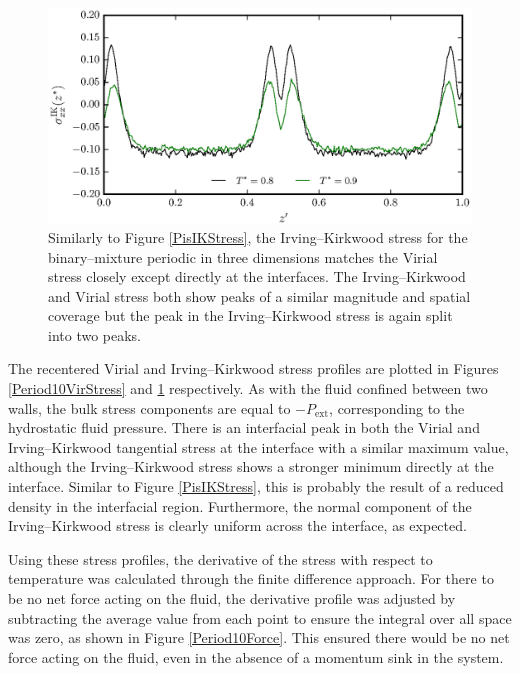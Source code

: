 \begin{figure}[h]
\centering
\includegraphics[scale=0.8]{Period10IKStress}
\caption{Similarly to Figure \ref{PisIKStress}, the Irving--Kirkwood stress for the binary--mixture periodic in three dimensions matches the Virial stress closely except directly at the interfaces.
The Irving--Kirkwood and Virial stress both show peaks of a similar magnitude and spatial coverage but the peak in the Irving--Kirkwood stress is again split into two peaks.
}
\label{Period10IKStress}
\end{figure}
The recentered Virial and Irving--Kirkwood stress profiles are plotted in Figures \ref{Period10VirStress} and \ref{Period10IKStress} respectively.
As with the fluid confined between two walls, the bulk stress components are equal to $-P_{\mathrm{ext}}$, corresponding to the hydrostatic fluid pressure.
There is an interfacial peak in both the Virial and Irving--Kirkwood tangential stress at the interface with a similar maximum value, although the Irving--Kirkwood stress shows a stronger minimum directly at the interface.
Similar to Figure \ref{PisIKStress}, this is probably the result of a reduced density in the interfacial region.
Furthermore, the normal component of the Irving--Kirkwood stress is clearly uniform across the interface, as expected.

\FloatBarrier
Using these stress profiles, the derivative of the stress with respect to temperature was calculated through the finite difference approach.
For there to be no net force acting on the fluid, the derivative profile was adjusted by subtracting the average value from each point to ensure the integral over all space was zero, as shown in Figure \ref{Period10Force}.
This ensured there would be no net force acting on the fluid, even in the absence of a momentum sink in the system.

